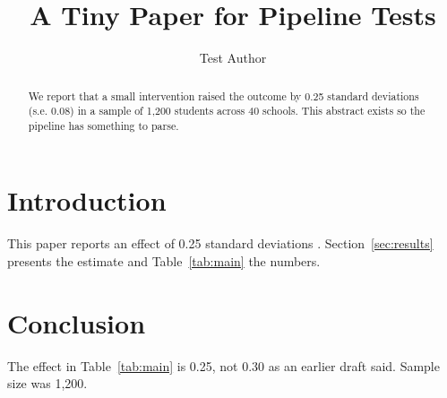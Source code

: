 \documentclass{article}
\title{A Tiny Paper for Pipeline Tests}
\author{Test Author}
\begin{document}
\maketitle

\begin{abstract}
We report that a small intervention raised the outcome by 0.25 standard deviations (s.e. 0.08) in a sample of 1,200 students across 40 schools. This abstract exists so the pipeline has something to parse.
\end{abstract}

\section{Introduction}
\label{sec:intro}
This paper reports an effect of 0.25 standard deviations \citep{doe2020}. Section~\ref{sec:results} presents the estimate and Table~\ref{tab:main} the numbers.



\section{Conclusion}
The effect in Table~\ref{tab:main} is 0.25, not 0.30 as an earlier draft said. Sample size was 1,200.



\end{document}
